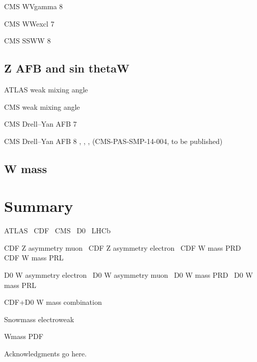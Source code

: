 \documentclass[12pt]{iopart}
\begin{document}
CMS WVgamma 8 \TeV~\cite{Chatrchyan:2014bza}

CMS WWexcl 7 \TeV~\cite{Chatrchyan:2013foa}

CMS SSWW 8 \TeV~\cite{Khachatryan:2014sta}

\subsection{Z AFB and sin thetaW}

ATLAS weak mixing angle~\cite{Aad:2015uau}

CMS weak mixing angle~\cite{Chatrchyan:2011ya}

CMS Drell--Yan AFB 7 \TeV~\cite{Chatrchyan:2012dc}

CMS Drell--Yan AFB 8 \TeV, \gz, \kz, \lz (CMS-PAS-SMP-14-004, to be published)

\subsection{W mass}

\section{Summary}


ATLAS~\cite{Aad:2008zzm}
CDF~\cite{Abulencia:2005ix}
CMS~\cite{CMSdetector}
D0~\cite{Abazov:2005pn}
LHCb~\cite{Alves:2008zz}

CDF Z asymmetry muon~\cite{Aaltonen:2014loa}
CDF Z asymmetry electron~\cite{Aaltonen:2013wcp}
CDF W mass PRD~\cite{Aaltonen:2013vwa}
CDF W mass PRL~\cite{Aaltonen:2012bp}

D0 W asymmetry electron~\cite{Abazov:2013dsa}
D0 W asymmetry muon~\cite{Abazov:2013rja}
D0 W mass PRD~\cite{D0:2013jba}
D0 W mass PRL~\cite{Abazov:2012bv}

CDF+D0 W mass combination~\cite{Aaltonen:2013iut}

Snowmass electroweak~\cite{Baak:2013fwa}

Wmass PDF~\cite{Bozzi:2011ww}

\ack
Acknowledgments go here. 



\end{document}
